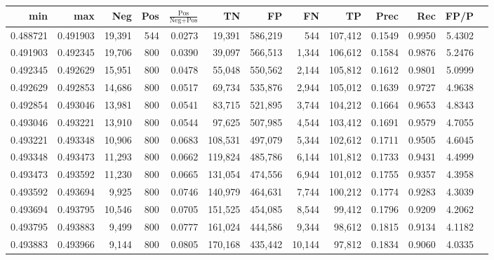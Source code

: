 \begin{tabular}{rrrrrrrrrrrrr}
\toprule
     min &      max &    Neg & Pos & $\frac{\text{Pos}}{\text{Neg}+\text{Pos}}$ &      TN &      FP &      FN &      TP &   Prec &    Rec &   FP/P \\
\midrule
0.488721 & 0.491903 & 19,391 & 544 &                                     0.0273 &  19,391 & 586,219 &     544 & 107,412 & 0.1549 & 0.9950 & 5.4302 \\
0.491903 & 0.492345 & 19,706 & 800 &                                     0.0390 &  39,097 & 566,513 &   1,344 & 106,612 & 0.1584 & 0.9876 & 5.2476 \\
0.492345 & 0.492629 & 15,951 & 800 &                                     0.0478 &  55,048 & 550,562 &   2,144 & 105,812 & 0.1612 & 0.9801 & 5.0999 \\
0.492629 & 0.492853 & 14,686 & 800 &                                     0.0517 &  69,734 & 535,876 &   2,944 & 105,012 & 0.1639 & 0.9727 & 4.9638 \\
0.492854 & 0.493046 & 13,981 & 800 &                                     0.0541 &  83,715 & 521,895 &   3,744 & 104,212 & 0.1664 & 0.9653 & 4.8343 \\
0.493046 & 0.493221 & 13,910 & 800 &                                     0.0544 &  97,625 & 507,985 &   4,544 & 103,412 & 0.1691 & 0.9579 & 4.7055 \\
0.493221 & 0.493348 & 10,906 & 800 &                                     0.0683 & 108,531 & 497,079 &   5,344 & 102,612 & 0.1711 & 0.9505 & 4.6045 \\
0.493348 & 0.493473 & 11,293 & 800 &                                     0.0662 & 119,824 & 485,786 &   6,144 & 101,812 & 0.1733 & 0.9431 & 4.4999 \\
0.493473 & 0.493592 & 11,230 & 800 &                                     0.0665 & 131,054 & 474,556 &   6,944 & 101,012 & 0.1755 & 0.9357 & 4.3958 \\
0.493592 & 0.493694 &  9,925 & 800 &                                     0.0746 & 140,979 & 464,631 &   7,744 & 100,212 & 0.1774 & 0.9283 & 4.3039 \\
0.493694 & 0.493795 & 10,546 & 800 &                                     0.0705 & 151,525 & 454,085 &   8,544 &  99,412 & 0.1796 & 0.9209 & 4.2062 \\
0.493795 & 0.493883 &  9,499 & 800 &                                     0.0777 & 161,024 & 444,586 &   9,344 &  98,612 & 0.1815 & 0.9134 & 4.1182 \\
0.493883 & 0.493966 &  9,144 & 800 &                                     0.0805 & 170,168 & 435,442 &  10,144 &  97,812 & 0.1834 & 0.9060 & 4.0335 \\

\end{tabular}
